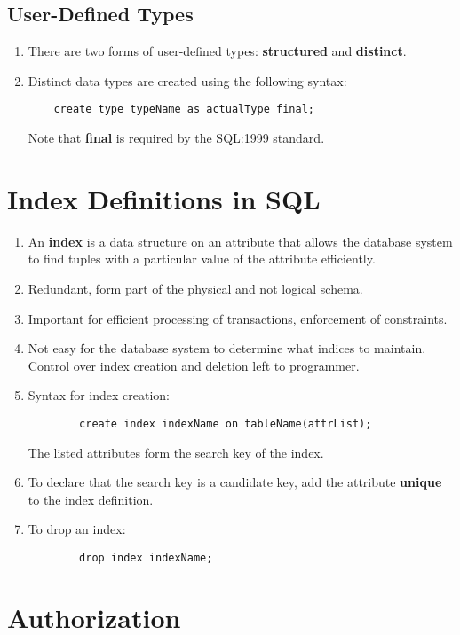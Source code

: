 \documentclass[journal,12pt,twocolumn]{IEEEtran}
\begin{document}
\subsection{User-Defined Types}
\begin{enumerate}
    \item There are two forms of user-defined types: \textbf{structured} and 
    \textbf{distinct}.
    \item Distinct data types are created using the following syntax:
    \begin{lstlisting}
    create type typeName as actualType final;
    \end{lstlisting}
    Note that \textbf{final} is required by the SQL:1999 standard.
\end{enumerate}

\section{Index Definitions in SQL}

\begin{enumerate}
    \item An \textbf{index} is a data structure on an attribute that allows the
    database system to find tuples with a particular value of the attribute 
    efficiently.
    \item Redundant, form part of the physical and not logical schema.
    \item Important for efficient processing of transactions, enforcement of 
    constraints.
    \item Not easy for the database system to determine what indices to maintain.
    Control over index creation and deletion left to programmer.
    \item Syntax for index creation:
    \begin{lstlisting}
        create index indexName on tableName(attrList);
    \end{lstlisting}
    The listed attributes form the search key of the index.
    \item To declare that the search key is a candidate key, add the attribute
    \textbf{unique} to the index definition.
    \item To drop an index:
    \begin{lstlisting}
        drop index indexName;
    \end{lstlisting}
\end{enumerate}

\section{Authorization}
\end{document}

